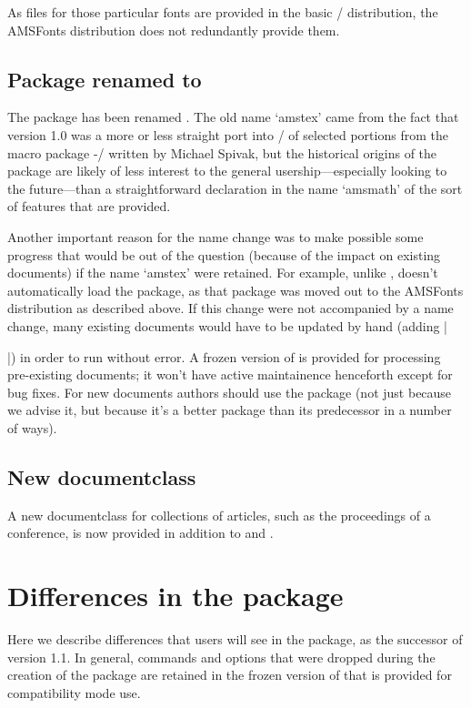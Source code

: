 \documentclass{amsdtx}
\begin{document}
As  files for those particular fonts are provided in the basic
\latex/ distribution, the AMSFonts distribution does not redundantly
provide them.

\subsection{Package  renamed to }

The  package has been renamed . The old name
`amstex' came from the fact that version 1.0 was a more or less straight
port into \latex/ of selected portions from the macro package \AmS-\tex/
written by Michael Spivak, but the historical origins of the package are
likely of less interest to the general usership---especially looking to
the future---than a straightforward declaration in the name `amsmath' of
the sort of features that are provided.

Another important reason for the name change was to make possible some
progress that would be out of the question (because of the impact on
existing documents) if the name `amstex' were retained. For example,
unlike ,  doesn't automatically load the
 package, as that package was moved out to the AMSFonts
distribution as described above. If this change were not accompanied by
a name change, many existing documents would have to be updated by hand
(adding |\usepackage{amsfonts}|) in order to run without error. A frozen
version of  is provided for processing pre-existing
documents; it won't have active maintainence henceforth except for bug
fixes. For new documents authors should use the  package
(not just because we advise it, but because it's a better package than
its predecessor in a number of ways).

\subsection{New documentclass }

A new documentclass  for collections of articles, such as
the proceedings of a conference, is now provided in addition to
 and .

\section{Differences in the  package}

Here we describe differences that users will see in the 
package, as the successor of  version 1.1. In general,
commands and options that were dropped during the creation of the
 package are retained in the frozen version of 
that is provided for compatibility mode use.
\end{document}
